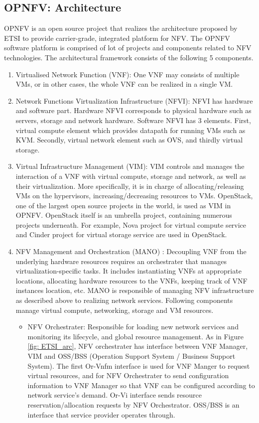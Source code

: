 \subsection{OPNFV: Architecture}
OPNFV\cite{OPNFV} is an open source project that realizes the architecture proposed by ETSI to provide carrier-grade, integrated platform for NFV. The OPNFV software platform is comprised of lot of projects and components related to NFV technologies. The architectural framework consists of the following 5 components. 
\begin{enumerate}
	\item Virtualised Network Function (VNF): One VNF may consists of multiple VMs, or in other cases, the whole VNF can be realized in a single VM.  
	\item Network Functions Virtualization Infrastructure (NFVI): NFVI has hardware and software part. Hardware NFVI corresponds to physical hardware such as servers, storage and network hardware. Software NFVI has 3 elements. First, virtual compute element which provides datapath for running VMs such as KVM. Secondly, virtual network element such as OVS, and thirdly virtual storage. 
	\item Virtual Infrastructure Management (VIM):  VIM controls and manages the interaction of a VNF with virtual compute, storage and network, as well as their virtualization. More specifically, it is in charge of allocating/releasing VMs on the hypervisors, increasing/decreasing resources to VMs. OpenStack, one of the largest open source projects in the world, is used as VIM in OPNFV. OpenStack itself is an umbrella project, containing numerous projects underneath. For example, Nova project for virtual compute service and Cinder project for virtual storage service are used in OpenStack.
	\item NFV Management and Orchestration (MANO) : Decoupling VNF from the underlying hardware resources requires an orchestrater that manages virtualization-specific tasks. It includes instantiating VNFs at appropriate locations, allocating hardware resources to the VNFs, keeping track of VNF instances location, etc. MANO is responsible of managing NFV infrastructure as described above to realizing network services. Following components manage virtual compute, networking, storage and VM resources. 
		\begin{itemize}
			\item NFV Orchestrater: Responsible for loading new network services and monitoring its lifecycle, and global resource management. As in Figure \ref{fig: ETSI_arc}, NFV orchestrater has interface between VNF Manager, VIM and OSS/BSS (Operation Support System / Business Support System). The first Or-Vnfm interface is used for VNF Manger to request virtual resources, and for NFV Orchestrater to send configuration information to VNF Manager so that VNF can be configured according to network service's demand. Or-Vi interface sends resource reservation/allocation requests by NFV Orchestrator. OSS/BSS is an interface that service provider operates through. 

\end{itemize}
\end{enumerate}
